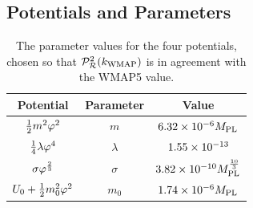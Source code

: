 \subsection{Potentials and Parameters}
\label{sec:pots-num}
\begin{table}[htb]
\begin{center}
\begin{tabular}{ccc}
\toprule
Potential & Parameter & Value\\
\midrule
$\frac{1}{2} m^2 \varphi^2$ & $m$ & $6.32\times 10^{-6}M_{\mathrm{PL}}$\\
$\frac{1}{4}\lambda\varphi^4$ & $\lambda$ & $1.55\times 10^{-13}$\\
$\sigma\varphi^{\frac{2}{3}}$ & $\sigma$ & $3.82\times 10^{-10}M_{\mathrm{PL}}^{\frac{10}{3}}$\\
$U_0 + \frac{1}{2} m_0^2 \varphi^2$ & $m_0$ & $1.74\times 10^{-6}M_{\mathrm{PL}}$\\
\bottomrule
\end{tabular}
\caption[Parameter values]{The parameter values for the four potentials, chosen so
that $\mathcal{P}_{\mathcal{R}}^2 (k_\mathrm{WMAP})$ is in agreement with the WMAP5 value.}
\label{tab:params-num}
\end{center}
% 
\end{table}

